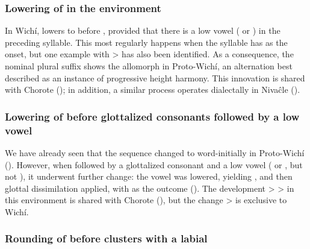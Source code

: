 \subsubsection{Lowering of  in the environment }\label{pm-wi-atits-atets}

In Wichí,  lowers to  before , provided that there is a low vowel ( or ) in the preceding syllable. This most regularly happens when the syllable has  as the onset, but one example with  >  has also been identified. As a consequence, the nominal plural suffix  shows the allomorph  in Proto-Wichí, an alternation best described as an instance of progressive height harmony. This innovation is shared with Chorote (); in addition, a similar process operates dialectally in Nivaĉle ().

\begin{exe}
    \ex \waterpl
    \ex \starn
    \ex \earthpl
    \ex \skinpl
\end{exe}

\subsubsection{Lowering of  before glottalized consonants followed by a low vowel}\label{pm-wi-ji-ha}

We have already seen that the sequence  changed to  word-initially in Proto-Wichí (). However, when followed by a glottalized consonant and a low vowel ( or , but not ), it underwent further change: the vowel was lowered, yielding , and then glottal dissimilation applied, with  as the outcome (). The development  >  >  in this environment is shared with Chorote (), but the change  >  is exclusive to Wichí.

\begin{exe}
    \ex \jaguar
    \ex \treen
    \ex \vulture
\end{exe}

\subsubsection{Rounding of  before clusters with a labial}\label{pm-wi-ew-ow}


